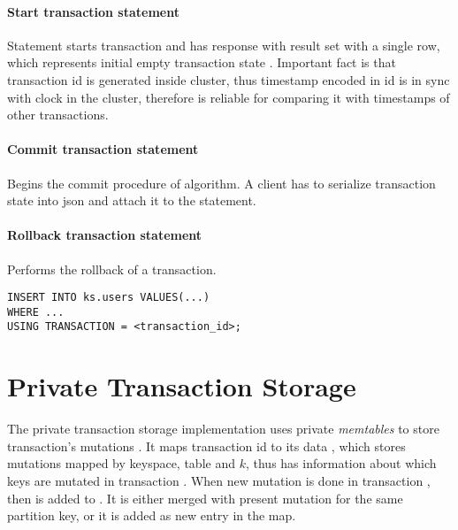 \paragraph{Start transaction statement} 
Statement starts transaction and has response with result set with a single row, which represents initial empty transaction state . 
 Important fact is that transaction id is generated inside cluster, thus timestamp encoded in id is in sync with clock in the cluster, therefore is reliable for comparing it with timestamps of other transactions.

\paragraph{Commit transaction statement} 
Begins the commit procedure of \mpt algorithm. A client has to serialize transaction state \txState into json and attach it to the statement.


\paragraph{Rollback transaction statement} 
Performs the rollback of a transaction. 


\begin{lstlisting}[style=outcode,label={lst:insertUsingTx},caption={Insert statement with using transactional clause}]
INSERT INTO ks.users VALUES(...) 
WHERE ...
USING TRANSACTION = <transaction_id>;
\end{lstlisting}


\section{Private Transaction Storage}
The private transaction storage implementation uses private \emph{memtables} to store transaction's mutations \mutations. It maps transaction id to its data , which stores mutations mapped by keyspace, table and $k$, thus \txStorage has information about which keys are mutated in transaction \transaction. 
When new mutation  is done in transaction \transaction, then  is added to . 
It is either merged with present mutation for the same partition key, or it is added as new entry in the map.


